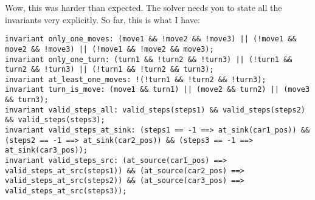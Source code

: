 \begin{enumerate}[label=(\alph*)]
    Wow, this was harder than expected. The solver needs you to state all the invariants very explicitly. So far, this is what I have:

    \begin{verbatim}
invariant only_one_moves: (move1 && !move2 && !move3) || (!move1 && move2 && !move3) || (!move1 && !move2 && move3);
invariant only_one_turn: (turn1 && !turn2 && !turn3) || (!turn1 && turn2 && !turn3) || (!turn1 && !turn2 && turn3);
invariant at_least_one_moves: !(!turn1 && !turn2 && !turn3);
invariant turn_is_move: (move1 && turn1) || (move2 && turn2) || (move3 && turn3);
invariant valid_steps_all: valid_steps(steps1) && valid_steps(steps2) && valid_steps(steps3);
invariant valid_steps_at_sink: (steps1 == -1 ==> at_sink(car1_pos)) && (steps2 == -1 ==> at_sink(car2_pos)) && (steps3 == -1 ==> at_sink(car3_pos));
invariant valid_steps_src: (at_source(car1_pos) ==> valid_steps_at_src(steps1)) && (at_source(car2_pos) ==> valid_steps_at_src(steps2)) && (at_source(car3_pos) ==> valid_steps_at_src(steps3));
    \end{verbatim}
\end{enumerate}

